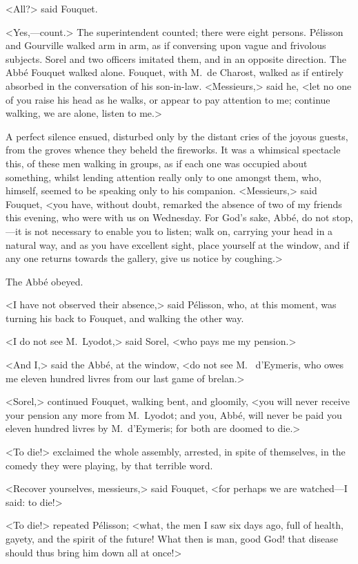 <All?> said Fouquet.

<Yes,—count.> The superintendent counted; there were eight persons. Pélisson and Gourville walked arm in arm, as if conversing upon vague and frivolous subjects. Sorel and two officers imitated them, and in an opposite direction. The Abbé Fouquet walked alone. Fouquet, with M.~de Charost, walked as if entirely absorbed in the conversation of his son-in-law. <Messieurs,> said he, <let no one of you raise his head as he walks, or appear to pay attention to me; continue walking, we are alone, listen to me.>

A perfect silence ensued, disturbed only by the distant cries of the joyous guests, from the groves whence they beheld the fireworks. It was a whimsical spectacle this, of these men walking in groups, as if each one was occupied about something, whilst lending attention really only to one amongst them, who, himself, seemed to be speaking only to his companion. <Messieurs,> said Fouquet, <you have, without doubt, remarked the absence of two of my friends this evening, who were with us on Wednesday. For God's sake, Abbé, do not stop,—it is not necessary to enable you to listen; walk on, carrying your head in a natural way, and as you have excellent sight, place yourself at the window, and if any one returns towards the gallery, give us notice by coughing.>

The Abbé obeyed.

<I have not observed their absence,> said Pélisson, who, at this moment, was turning his back to Fouquet, and walking the other way.

<I do not see M.~Lyodot,> said Sorel, <who pays me my pension.>

<And I,> said the Abbé, at the window, <do not see M.~ d'Eymeris, who owes me eleven hundred livres from our last game of brelan.>

<Sorel,> continued Fouquet, walking bent, and gloomily, <you will never receive your pension any more from M.~Lyodot; and you, Abbé, will never be paid you eleven hundred livres by M.~d'Eymeris; for both are doomed to die.>

<To die!> exclaimed the whole assembly, arrested, in spite of themselves, in the comedy they were playing, by that terrible word.

<Recover yourselves, messieurs,> said Fouquet, <for perhaps we are watched—I said: to die!>

<To die!> repeated Pélisson; <what, the men I saw six days ago, full of health, gayety, and the spirit of the future! What then is man, good God! that disease should thus bring him down all at once!>

